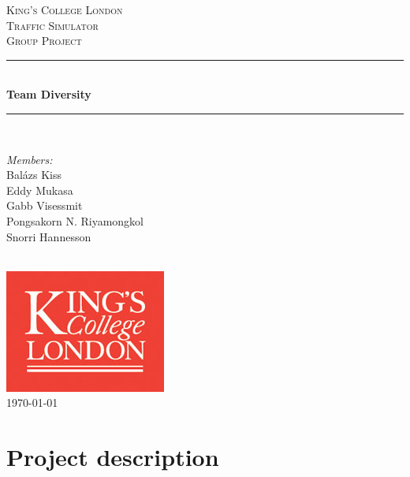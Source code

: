 \documentclass[11pt]{article}
\begin{document}

\begin{titlepage}

\newcommand{\HRule}{\rule{\linewidth}{0.5mm}}
\center
\textsc{\LARGE King's College London}\\[1.5cm]
\textsc{\Large Traffic Simulator}\\[0.5cm]
\textsc{\large Group Project}\\[0.5cm]
\HRule \\[0.4cm]
{ \huge \bfseries Team Diversity}\\[0.4cm]
\HRule \\[1.5cm]

\begin{minipage}{0.4\textwidth} \large
\begin{center}
\emph{Members:}\\
Balázs Kiss \\
Eddy Mukasa \\
Gabb Visessmit \\
Pongsakorn N. Riyamongkol \\
Snorri Hannesson
\end{center}
\end{minipage}
\\[2cm]

\includegraphics{KingsLogo}\\[1cm] 

{\large \today}\\[3cm]

\vfill

\end{titlepage}


\section{Project description}
\end{document}

